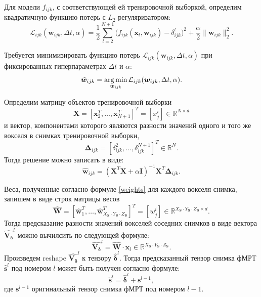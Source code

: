 \documentclass[12pt,twoside]{article}
\begin{document}
Для модели $f_{ijk}$, с соответствующей ей тренировочной выборкой,
определим квадратичную функцию потерь с $L_2$ регуляризатором:
\begin{equation}
	\label{Loss}
	\mathcal{L}_{ijk}(\bm{w}_{ijk}, \Delta t, \alpha) = \frac{1}{2} \sum\limits_{l = 2}^{N+1} \big(f_{ijk}(\bm{x}_l, \bm{w}_{ijk}) - \delta^{l}_{ijk}\big)^2 + \frac{\alpha}{2} \|\bm{w}_{ijk}\|^2_2.
\end{equation}

Требуется минимизировать функцию потерь $\mathcal{L}_{ijk}(\bm{w}_{ijk}, \Delta t, \alpha)$ при фиксированных гиперпараметрах $\Delta t$ и $\alpha$:
\begin{equation}
	\label{main_Problem}
	\hat{\bm{w}}_{ijk} = \argmin_{\bm{w}_{ijk}} \mathcal{L}_{ijk}(\bm{w}_{ijk}, \Delta t, \alpha).
\end{equation}

Определим матрицу объектов тренировочной выборки
\begin{equation}
\label{X}
    \bm{X} = [\bm{x}_2^T, \dots, \bm{x}_{N+1}^T]^T = [x^i_j] \in \mathbb{R}^{N \times d}
\end{equation}
и вектор, компонентами которого являются разности значений одного и того же вокселя в снимках тренировочной выборки,
\begin{equation}
\label{Delta}
    \bm{\Delta}_{ijk} = [\delta^{2}_{ijk}, \dots, \delta^{N+1}_{ijk}]^T \in \mathbb{R}^{N}.
\end{equation}
Тогда решение можно записать в виде:
\begin{equation}
\label{weights}
    \hat{\bm{w}}_{ijk} = (\bm{X}^T \bm{X} + \alpha \mathbf{I})^{-1} \bm{X}^T \mathbf{\Delta}_{ijk}.
\end{equation}

Веса, полученные согласно формуле \eqref{weights} для каждого вокселя снимка, запишем в виде строк матрицы весов
\begin{equation}
\label{matrix_weights}
    \hat{\bm{W}} = [\hat{\bm{w}}_1^T, \dots, \hat{\bm{w}}_{X_{\bm{S}} \cdot Y_{\bm{S}} \cdot Z_{\bm{S}}}^T]^T = [w^i_j] \in \mathbb{R}^{X_{\bm{S}} \cdot Y_{\bm{S}} \cdot Z_{\bm{S}} \times d}.
\end{equation}
Тогда предсказание разности значений вокселей соседних снимков в виде вектора $\hat{\bm{{V_{\delta}}}}^l$ можно вычилсить по следующей формуле:
\begin{equation}
\label{Vector_delta}
    \hat{\bm{{V_{\delta}}}}^l = \hat{\bm{W}} \cdot \bm{x}_l \in \mathbb{R}^{X_{\bm{S}} \cdot Y_{\bm{S}} \cdot Z_{\bm{S}}}.
\end{equation}
Произведем reshape $\hat{\bm{{V_{\delta}}}}^l$ к тензору $\hat{\bm{\delta}}^l$. Тогда предсказанный тензор снимка фМРТ $\hat{\bm{s}}^l$ под номером $l$ может быть получен согласно формуле:
\begin{equation}
    \label{Vector_delta}
    \hat{\bm{s}}^l = \hat{\bm{\delta}}^l + \bm{s}^{l-1},
\end{equation}
где $\bm{s}^{l-1}$ оригинальный тензор снимка фМРТ под номером $l-1$.
\end{document}
